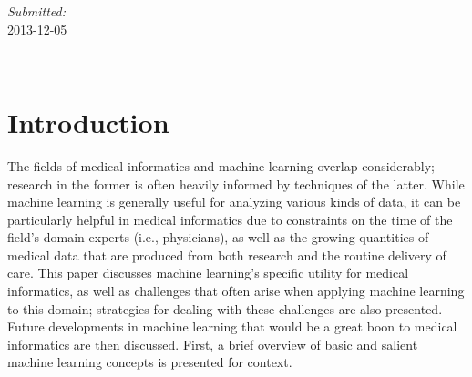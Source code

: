 \documentclass[12pt]{article} %
\begin{document}
\begin{titlepage}

\begin{minipage}{0.4\textwidth}
\begin{center} \large
\emph{Submitted:} \\
2013-12-05 %
\end{center}
\end{minipage}\\[4cm]

\vfill %
\end{titlepage}


\fontsize{12}{30}%
\selectfont



\section{Introduction}
The fields of medical informatics and machine learning overlap considerably; research in the former is often heavily informed by techniques of the latter.
While machine learning is generally useful for analyzing various kinds of data, it can be particularly helpful in medical informatics due to constraints on the time of the field's domain experts (i.e., physicians), as well as the growing quantities of medical data that are produced from both research and the routine delivery of care.
This paper discusses machine learning's specific utility for medical informatics, as well as challenges that often arise when applying machine learning to this domain; strategies for dealing with these challenges are also presented.
Future developments in machine learning that would be a great boon to medical informatics are then discussed.
First, a brief overview of basic and salient machine learning concepts is presented for context.
\end{document}
